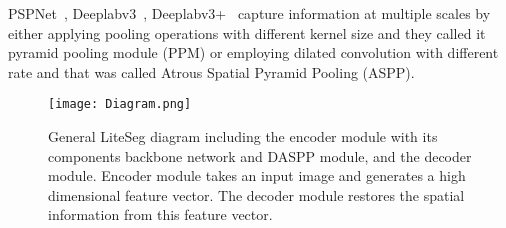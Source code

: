 \documentclass[conference,a4paper]{IEEEtran}
\begin{document}
PSPNet~\cite{zhao2017pspnet}, Deeplabv3~\cite{deeplabv3}, Deeplabv3+~\cite{deeplabv3plus} capture information at multiple scales by either applying pooling operations with different kernel size and they called it pyramid pooling module (PPM) or employing dilated convolution with different rate and that was called Atrous Spatial Pyramid Pooling (ASPP).
\\
\begin{figure*}[t]
    \centering
    \texttt{[image: Diagram.png]}
    \caption{General LiteSeg diagram including the encoder module with its components backbone network and DASPP module, and the decoder module. Encoder module takes an input image and generates a high dimensional feature vector. The decoder module restores the spatial information from this feature vector.   }
    \label{fig:diagram}
\end{figure*}
\end{document}

